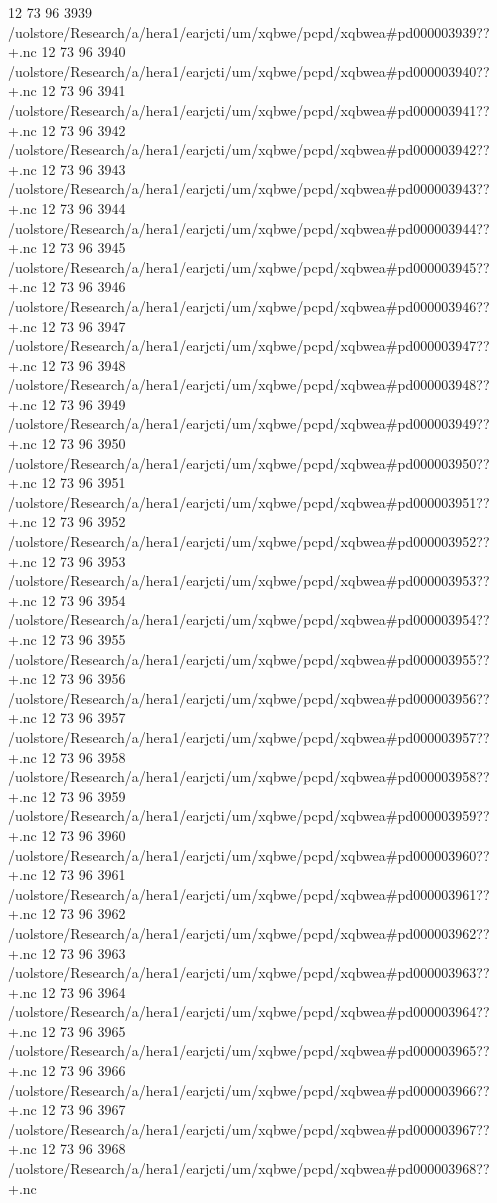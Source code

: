 12 73 96
3939
/uolstore/Research/a/hera1/earjcti/um/xqbwe/pcpd/xqbwea#pd000003939??+.nc
12 73 96
3940
/uolstore/Research/a/hera1/earjcti/um/xqbwe/pcpd/xqbwea#pd000003940??+.nc
12 73 96
3941
/uolstore/Research/a/hera1/earjcti/um/xqbwe/pcpd/xqbwea#pd000003941??+.nc
12 73 96
3942
/uolstore/Research/a/hera1/earjcti/um/xqbwe/pcpd/xqbwea#pd000003942??+.nc
12 73 96
3943
/uolstore/Research/a/hera1/earjcti/um/xqbwe/pcpd/xqbwea#pd000003943??+.nc
12 73 96
3944
/uolstore/Research/a/hera1/earjcti/um/xqbwe/pcpd/xqbwea#pd000003944??+.nc
12 73 96
3945
/uolstore/Research/a/hera1/earjcti/um/xqbwe/pcpd/xqbwea#pd000003945??+.nc
12 73 96
3946
/uolstore/Research/a/hera1/earjcti/um/xqbwe/pcpd/xqbwea#pd000003946??+.nc
12 73 96
3947
/uolstore/Research/a/hera1/earjcti/um/xqbwe/pcpd/xqbwea#pd000003947??+.nc
12 73 96
3948
/uolstore/Research/a/hera1/earjcti/um/xqbwe/pcpd/xqbwea#pd000003948??+.nc
12 73 96
3949
/uolstore/Research/a/hera1/earjcti/um/xqbwe/pcpd/xqbwea#pd000003949??+.nc
12 73 96
3950
/uolstore/Research/a/hera1/earjcti/um/xqbwe/pcpd/xqbwea#pd000003950??+.nc
12 73 96
3951
/uolstore/Research/a/hera1/earjcti/um/xqbwe/pcpd/xqbwea#pd000003951??+.nc
12 73 96
3952
/uolstore/Research/a/hera1/earjcti/um/xqbwe/pcpd/xqbwea#pd000003952??+.nc
12 73 96
3953
/uolstore/Research/a/hera1/earjcti/um/xqbwe/pcpd/xqbwea#pd000003953??+.nc
12 73 96
3954
/uolstore/Research/a/hera1/earjcti/um/xqbwe/pcpd/xqbwea#pd000003954??+.nc
12 73 96
3955
/uolstore/Research/a/hera1/earjcti/um/xqbwe/pcpd/xqbwea#pd000003955??+.nc
12 73 96
3956
/uolstore/Research/a/hera1/earjcti/um/xqbwe/pcpd/xqbwea#pd000003956??+.nc
12 73 96
3957
/uolstore/Research/a/hera1/earjcti/um/xqbwe/pcpd/xqbwea#pd000003957??+.nc
12 73 96
3958
/uolstore/Research/a/hera1/earjcti/um/xqbwe/pcpd/xqbwea#pd000003958??+.nc
12 73 96
3959
/uolstore/Research/a/hera1/earjcti/um/xqbwe/pcpd/xqbwea#pd000003959??+.nc
12 73 96
3960
/uolstore/Research/a/hera1/earjcti/um/xqbwe/pcpd/xqbwea#pd000003960??+.nc
12 73 96
3961
/uolstore/Research/a/hera1/earjcti/um/xqbwe/pcpd/xqbwea#pd000003961??+.nc
12 73 96
3962
/uolstore/Research/a/hera1/earjcti/um/xqbwe/pcpd/xqbwea#pd000003962??+.nc
12 73 96
3963
/uolstore/Research/a/hera1/earjcti/um/xqbwe/pcpd/xqbwea#pd000003963??+.nc
12 73 96
3964
/uolstore/Research/a/hera1/earjcti/um/xqbwe/pcpd/xqbwea#pd000003964??+.nc
12 73 96
3965
/uolstore/Research/a/hera1/earjcti/um/xqbwe/pcpd/xqbwea#pd000003965??+.nc
12 73 96
3966
/uolstore/Research/a/hera1/earjcti/um/xqbwe/pcpd/xqbwea#pd000003966??+.nc
12 73 96
3967
/uolstore/Research/a/hera1/earjcti/um/xqbwe/pcpd/xqbwea#pd000003967??+.nc
12 73 96
3968
/uolstore/Research/a/hera1/earjcti/um/xqbwe/pcpd/xqbwea#pd000003968??+.nc
